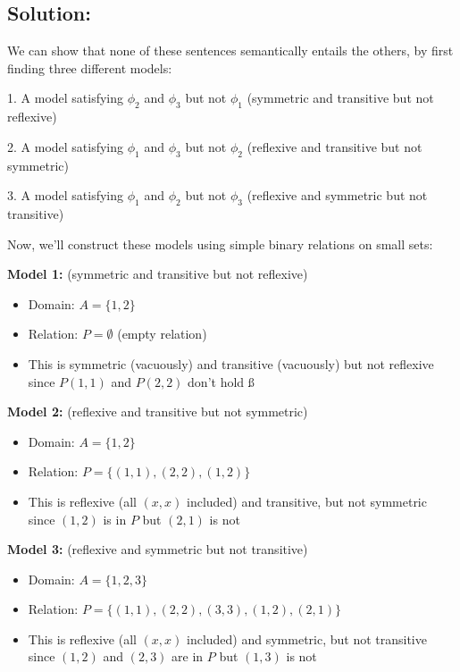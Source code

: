 \documentclass{article}
\begin{document}
\subsection*{Solution:}
We can show that none of these sentences semantically entails the others, by first finding three different models:
    
\vspace{1em}
1. A model satisfying $\phi_2$ and $\phi_3$ but not $\phi_1$ (symmetric and transitive but not reflexive)

2. A model satisfying $\phi_1$ and $\phi_3$ but not $\phi_2$ (reflexive and transitive but not symmetric)

3. A model satisfying $\phi_1$ and $\phi_2$ but not $\phi_3$ (reflexive and symmetric but not transitive)


\vspace{1em}
Now, we'll construct these models using simple binary relations on small sets:
    
\vspace{1em}

\textbf{Model 1:} (symmetric and transitive but not reflexive)
\begin{itemize}
    \item Domain: $A = \{1, 2\}$
    \item Relation: $P = \emptyset$ (empty relation)
    \item This is symmetric (vacuously) and transitive (vacuously) but not reflexive since $P(1,1)$ and $P(2,2)$ don't hold   ß
\end{itemize}

    
\textbf{Model 2:} (reflexive and transitive but not symmetric)

\begin{itemize}
\item Domain: $A = \{1, 2\}$
    \item Relation: $P = \{(1,1), (2,2), (1,2)\}$
    \item This is reflexive (all $(x,x)$ included) and transitive, but not symmetric since $(1,2)$ is in $P$ but $(2,1)$ is not
\end{itemize}

\textbf{Model 3:} (reflexive and symmetric but not transitive)
\begin{itemize}
    \item Domain: $A = \{1, 2, 3\}$
    \item Relation: $P = \{(1,1), (2,2), (3,3), (1,2), (2,1)\}$
    \item This is reflexive (all $(x,x)$ included) and symmetric, but not transitive since $(1,2)$ and $(2,3)$ are in $P$ but $(1,3)$ is not
\end{itemize}
    
\end{document}
